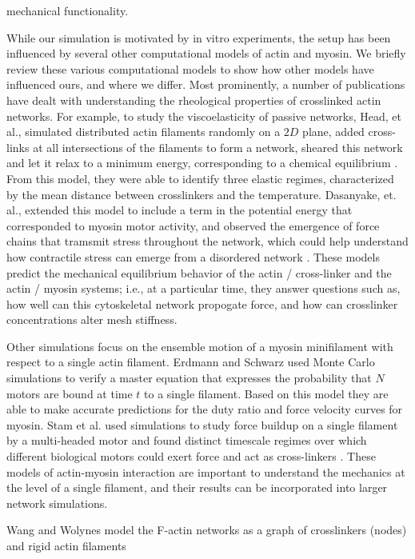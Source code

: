 \documentclass[12pt]{article}
\begin{document}
mechanical functionality.  
\par
While our simulation is motivated by in vitro experiments, the setup has been influenced by several other computational
models of actin and myosin. We briefly review these various computational models to show how other models have
influenced ours, and where we differ.
Most prominently, a number of publications have dealt with understanding the rheological properties of crosslinked actin
networks\cite{mackintosh1995, head2003, wilhelm2003, kim2009}.  
For example, to study the viscoelasticity of passive networks,  Head, et al., simulated distributed actin filaments randomly 
on a $2D$ plane, added cross-links at all intersections of the filaments to form a network, sheared 
this network and let it relax to a minimum energy, corresponding to a chemical equilibrium \cite{head2003}. 
From this model, they were able to identify three elastic regimes,
characterized by the mean distance between crosslinkers and the temperature. 
Dasanyake, et. al., extended this model to include a term in the potential energy that corresponded to
myosin motor activity, and observed the emergence of force chains that tramsmit stress throughout the network,
which could help understand how contractile stress can emerge from a disordered network \cite{dasanyake2011}.
These models predict the mechanical equilibrium behavior of the actin / cross-linker and the actin / myosin
systems; i.e., at a particular time, they answer questions such as, how well can this cytoskeletal network propogate
force, and how can crosslinker concentrations alter mesh stiffness.
\par
Other simulations focus on the ensemble motion of a myosin minifilament with respect to a single actin filament.  
Erdmann and Schwarz used Monte Carlo simulations to verify a master equation that expresses the probability that $N$ motors are 
bound at time $t$ to a single filament\cite{erdmann2012}. Based on this model they are able to make accurate predictions for 
the duty ratio and force velocity curves for myosin. Stam et al. used simulations to study force buildup on a single 
filament by a multi-headed motor and found
distinct timescale regimes over which different biological motors could exert force and act as cross-linkers
\cite{stam2015}. These models of actin-myosin interaction are important to understand the mechanics at
the level of a single filament, and their results can be incorporated into larger network simulations. 
\par
Wang and Wolynes \cite{wang2012} model the F-actin networks as a graph of crosslinkers (nodes) and rigid actin filaments
\end{document}
